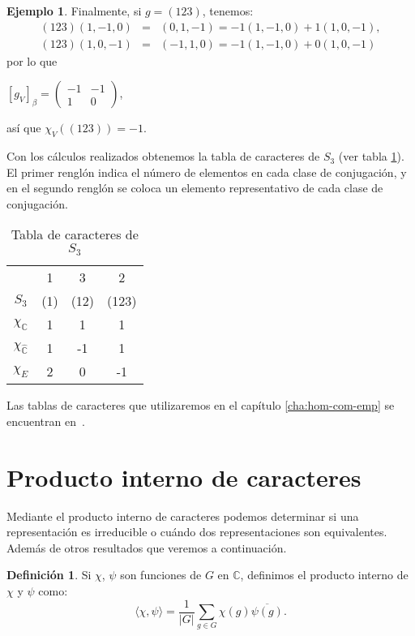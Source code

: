 \documentclass[12pt]{book}
\theoremstyle{definition}
\newtheorem{definition}[theorem]{Definición}
\newtheorem{example}[theorem]{Ejemplo}
\newcounter{in}
\newcounter{ini}
\begin{document}
\begin{example}
Finalmente, si $g=(123)$, tenemos:
\begin{eqnarray*}
  (123)(1,-1,0)&=&(0,1,-1)=-1(1,-1,0)+1(1,0,-1),\\
  (123)(1,0,-1)&=&(-1,1,0)=-1(1,-1,0)+0(1,0,-1)
\end{eqnarray*} 
por lo que 
\begin{center}
  $[g_{V}]_{\beta}=
  \begin{pmatrix}
    -1 & -1 \\
    1 & 0 
  \end{pmatrix}$,
\end{center}
así que $\chi_{V}((123))=-1$.

Con los cálculos realizados obtenemos la tabla de caracteres de
$S_{3}$ (ver tabla \ref{tabla-car-S3}). El primer renglón indica el
número de elementos en cada clase de conjugación, y en el segundo
renglón se coloca un elemento representativo de cada clase de
conjugación.
\begin{table}[htpb]
  \centering
  \begin{tabular}{ c| c c c}
      & 1 & 3 & 2 \\
      $S_{3}$ & (1) & (12) & (123) \\
      \hline
      $\chi_{\mathbb{C}}$ & 1 & 1 & 1 \\
      $\chi_{\mathbb{\hat C}}$ & 1 & -1 & 1 \\
      $\chi_{E}$ & 2 & 0 & -1 
    \end{tabular}
    
  \caption{Tabla de caracteres de $S_{3}$}
  \label{tabla-car-S3}
\end{table}

Las tablas de caracteres que utilizaremos en el capítulo
\ref{cha:hom-com-emp} se encuentran en~\cite{liebeck}.
\end{example}

\section{Producto interno de caracteres}
\label{producto-interno}

Mediante el producto interno de caracteres  podemos determinar si una
representación es irreducible o cuándo dos representaciones son
equivalentes. Además de otros resultados que veremos a continuación.
\begin{definition}
  Si $\chi$, $\psi$ son funciones de $G$ en $\mathbb{C}$, definimos el
  producto interno de $\chi$ y $\psi$ como:
  \begin{equation*}
    \langle\chi,\psi\rangle=\frac{1}{|G|}\sum_{g\in G}\chi(g)\overline{\psi(g)}.
  \end{equation*}
\end{definition}
\end{document}
